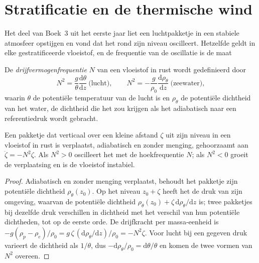 \section{Stratificatie en de thermische wind}\label{sec:b3:gfd-foundations:stratification}

Het deel van Boek~3 uit het eerste jaar liet een luchtpakketje in een stabiele
atmosfeer opstijgen en vond dat het rond zijn niveau oscilleert. Hetzelfde geldt
in elke gestratificeerde vloeistof, en de frequentie van de oscillatie is de maat

\begin{definition}[Drijfvermogenfrequentie]\label{def:b3:gfd-foundations:buoyancy}
De \emph{drijfvermogenfrequentie} $N$ van een vloeistof in
rust wordt gedefinieerd door
\[
N^2 = \frac{g}{\theta}\frac{\mathrm d\theta}{\mathrm dz}\ \text{(lucht)},
\qquad
N^2 = -\frac{g}{\rho_0}\frac{\mathrm d\rho_\theta}{\mathrm dz}\ \text{(zeewater)},
\]
waarin $\theta$ de potentiële temperatuur van de lucht is en $\rho_\theta$ de
potentiële dichtheid van het water, de dichtheid die het zou krijgen als het
adiabatisch naar een referentiedruk wordt gebracht.
\end{definition}

\begin{theorem}\label{thm:b3:gfd-foundations:buoyancy}
Een pakketje dat verticaal over een kleine afstand $\zeta$ uit zijn niveau in een
vloeistof in rust is verplaatst, adiabatisch en zonder menging, gehoorzaamt aan $\ddot\zeta =
-N^2\zeta$. Als $N^2 > 0$ oscilleert het met de hoekfrequentie $N$; als
$N^2 < 0$ groeit de verplaatsing en is de vloeistof instabiel.
\end{theorem}

\begin{proof}
Adiabatisch en zonder menging verplaatst, behoudt het pakketje zijn potentiële
dichtheid $\rho_\theta(z_0)$. Op het niveau $z_0 + \zeta$ heeft het de druk van
zijn omgeving, waarvan de potentiële dichtheid $\rho_\theta(z_0) +
\zeta\,\mathrm d\rho_\theta/\mathrm dz$ is; twee pakketjes bij dezelfde druk
verschillen in dichtheid met het verschil van hun potentiële dichtheden, tot op
de eerste orde. De drijfkracht per massa-eenheid is $-g(\rho_p - \rho_e)/\rho_0 =
g\,\zeta\,(\mathrm d\rho_\theta/\mathrm dz)/\rho_0 = -N^2\zeta$. Voor lucht bij
een gegeven druk varieert de dichtheid als $1/\theta$, dus $-\mathrm
d\rho_\theta/\rho_0 = \mathrm d\theta/\theta$ en komen de twee vormen van $N^2$
overeen.
\end{proof}

